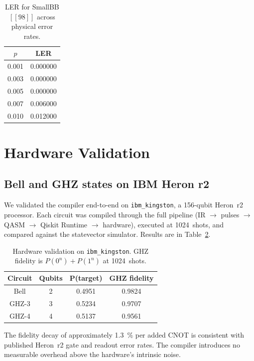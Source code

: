 \documentclass[aps,prApplied,twocolumn,superscriptaddress,floatfix]{revtex4-2}
\begin{document}
\begin{table}[b]
\caption{\label{tab:ler}LER for SmallBB$[[98]]$ across physical error
rates.}
\begin{ruledtabular}
\begin{tabular}{cc}
$p$ & LER \\
\hline
0.001 & 0.000000 \\
0.003 & 0.000000 \\
0.005 & 0.000000 \\
0.007 & 0.006000 \\
0.010 & 0.012000 \\
\end{tabular}
\end{ruledtabular}
\end{table}

\section{Hardware Validation}
\label{sec:hardware}

\subsection{Bell and GHZ states on IBM Heron r2}

We validated the compiler end-to-end on \texttt{ibm\_kingston}, a
156-qubit Heron~r2 processor. Each circuit was compiled through the full
pipeline (IR $\to$ pulses $\to$ QASM $\to$ Qiskit Runtime $\to$
hardware), executed at \num{1024}~shots, and compared against the
statevector simulator. Results are in Table~\ref{tab:hardware}.

\begin{table}[b]
\caption{\label{tab:hardware}Hardware validation on
\texttt{ibm\_kingston}. GHZ fidelity is $P(0^n) + P(1^n)$ at
\num{1024}~shots.}
\begin{ruledtabular}
\begin{tabular}{cccc}
Circuit & Qubits & P(target) & GHZ fidelity \\
\hline
Bell   & 2 & 0.4951 & 0.9824 \\
GHZ-3  & 3 & 0.5234 & 0.9707 \\
GHZ-4  & 4 & 0.5137 & 0.9561 \\
\end{tabular}
\end{ruledtabular}
\end{table}

The fidelity decay of approximately \SI{1.3}{\percent} per added CNOT is
consistent with published Heron~r2 gate and readout error rates. The
compiler introduces no measurable overhead above the hardware's
intrinsic noise.
\end{document}
